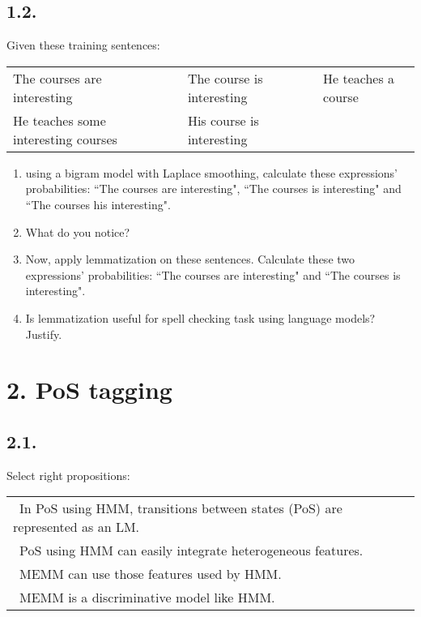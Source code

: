 \documentclass[11pt, a4paper]{article}
\begin{document}
\subsection*{1.2.}

Given these training sentences: 

\begin{tabular}{|lllll|}
	\hline
	The courses are interesting && The course is interesting && He teaches a course \\
	He teaches some interesting courses && His course is interesting &&\\
	\hline
\end{tabular}

\begin{enumerate}
	\item using a bigram model with Laplace smoothing, calculate these expressions' probabilities: ``The courses are interesting", ``The courses is interesting" and ``The courses his interesting".
	\item What do you notice?
	\item Now, apply lemmatization on these sentences.
	Calculate these two expressions' probabilities:  ``The courses are interesting" and ``The courses is interesting".
	\item Is lemmatization useful for spell checking task using language models? Justify.
\end{enumerate}


\section*{2. PoS tagging}

\subsection*{2.1.}

Select right propositions:

\begin{longtable}{|p{}|}
	\hline 
	\Square\ In PoS using HMM, transitions between states (PoS) are represented as an LM. \\
	\Square\ PoS using HMM can easily integrate heterogeneous features. \\	
	\Square\ MEMM can use those features used by HMM. \\
	\Square\ MEMM is a discriminative model like HMM. \\
	
	\hline
\end{longtable}
\end{document}
